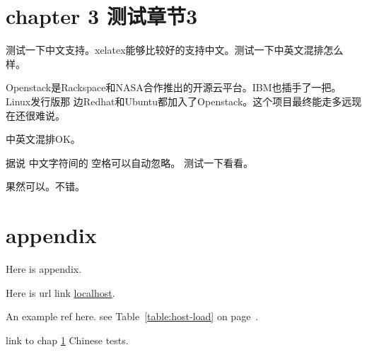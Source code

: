 \documentclass[a4paper,10pt]{book}
\begin{document}
\chapter{chapter 3 测试章节3}\label{chap3}
测试一下中文支持。xelatex能够比较好的支持中文。测试一下中英文混排怎么样。

Openstack是Rackspace和NASA合作推出的开源云平台。IBM也插手了一把。Linux发行版那
边Redhat和Ubuntu都加入了Openstack。这个项目最终能走多远现在还很难说。

中英文混排OK。

据说 中文字符间的    空格可以自动忽略。    测试一下看看。

果然可以。不错。

\appendix
\chapter{appendix}
Here is appendix.

Here is url link \href{http://localhost/}{localhost}.

An example ref here.
see Table~\ref{table:host-load} on page~\pageref{table:host-load}.

link to chap \ref{chap3} Chinese tests.
\end{document}
